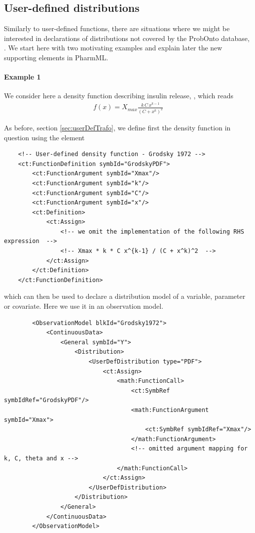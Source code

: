 \subsection{User-defined distributions}
\label{sec:userDefDistros}

Similarly to user-defined functions, there are situations where we might 
be interested in declarations of distributions not covered by the ProbOnto
database, \cite{Swat:2016qf}. 
We start here with two motivating examples and explain later the new supporting
elements in PharmML.

\paragraph{Example 1} We consider here a density function describing insulin release,
\cite{Grodsky:1972kq}, which reads
\begin{align}
f(x) = X_{max} \frac{k \,C \,x^{k-1}}{(C + x^k)^2} \nonumber
\end{align}

As before, section \ref{sec:userDefTrafo}, we define first the density function
in question using the  element
\lstset{language=XML}
\begin{lstlisting}
    <!-- User-defined density function - Grodsky 1972 -->
    <ct:FunctionDefinition symbId="GrodskyPDF">
        <ct:FunctionArgument symbId="Xmax"/>
        <ct:FunctionArgument symbId="k"/>
        <ct:FunctionArgument symbId="C"/>
        <ct:FunctionArgument symbId="x"/>
        <ct:Definition>
            <ct:Assign>
                <!-- we omit the implementation of the following RHS expression  -->
                <!-- Xmax * k * C x^{k-1} / (C + x^k)^2  -->
            </ct:Assign>
        </ct:Definition>
    </ct:FunctionDefinition>
\end{lstlisting}
which can then be used to declare a distribution model of a variable, parameter 
or covariate. Here we use it in an observation model.

\lstset{language=XML}
\begin{lstlisting}
        <ObservationModel blkId="Grodsky1972">
            <ContinuousData>
                <General symbId="Y">
                    <Distribution>
                        <UserDefDistribution type="PDF">
                            <ct:Assign>
                                <math:FunctionCall>
                                    <ct:SymbRef symbIdRef="GrodskyPDF"/>
                                    <math:FunctionArgument symbId="Xmax">
                                        <ct:SymbRef symbIdRef="Xmax"/>
                                    </math:FunctionArgument>
                                    <!-- omitted argument mapping for k, C, theta and x -->
                                </math:FunctionCall>
                            </ct:Assign>
                        </UserDefDistribution>
                    </Distribution>
                </General>
            </ContinuousData>
        </ObservationModel>
\end{lstlisting}

